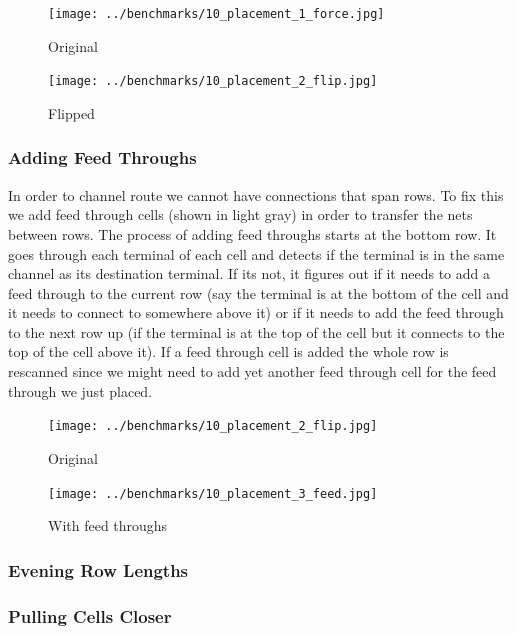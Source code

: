\documentclass[10pt]{article}
\begin{document}
        \begin{figure}[H]
            \centering
            \texttt{[image: ../benchmarks/10\_placement\_1\_force.jpg]}
            \caption{Original}
        \end{figure}
        \begin{figure}[H]
            \centering
            \texttt{[image: ../benchmarks/10\_placement\_2\_flip.jpg]}
            \caption{Flipped}
        \end{figure}

        \subsubsection{Adding Feed Throughs}

        In order to channel route we cannot have connections that span rows. To
        fix this we add feed through cells (shown in light gray) in order to
        transfer the nets between rows. The process of adding feed throughs
        starts at the bottom row. It goes through each terminal of each cell
        and detects if the terminal is in the same channel as its destination
        terminal. If its not, it figures out if it needs to add a feed through
        to the current row (say the terminal is at the bottom of the cell and
        it needs to connect to somewhere above it) or if it needs to add the
        feed through to the next row up (if the terminal is at the top of the
        cell but it connects to the top of the cell above it). If a feed
        through cell is added the whole row is rescanned since we might need to
        add yet another feed through cell for the feed through we just placed.

        \begin{figure}[H]
            \centering
            \texttt{[image: ../benchmarks/10\_placement\_2\_flip.jpg]}
            \caption{Original}
        \end{figure}
        \begin{figure}[H]
            \centering
            \texttt{[image: ../benchmarks/10\_placement\_3\_feed.jpg]}
            \caption{With feed throughs}
        \end{figure}

        \subsubsection{Evening Row Lengths}

        \subsubsection{Pulling Cells Closer}
\end{document}
